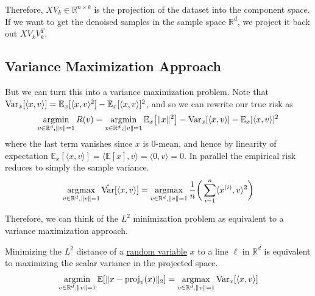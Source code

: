   Therefore, $X V_k \in \mathbb{R}^{n \times k}$ is the projection of the dataset into the component space. If we want to get the denoised samples in the sample space $\mathbb{R}^d$, we project it back out $X V_k V_k^T$. 

\subsection{Variance Maximization Approach}

  But we can turn this into a variance maximization problem. Note that $\operatorname{Var}_x [\langle x, v \rangle] = \mathbb{E}_x [ \langle x, v \rangle^2 ] - \mathbb{E}_x [ \langle x, v \rangle]^2$, and so we can rewrite our true risk as 
  \begin{align}
    \operatorname*{\arg\!\min}_{v \in \mathbb{R}^d, \|v\|=1} R(v) = \operatorname*{\arg\!\min}_{v \in \mathbb{R}^d, \|v\|=1} \mathbb{E}_x \big[ \|x\|^2 \big] - \operatorname{Var}_x [\langle x, v \rangle] - \mathbb{E}_x [ \langle x, v \rangle]^2
  \end{align} 
  where the last term vanishes since $x$ is $0$-mean, and hence by linearity of expectation $\mathbb{E}_x [\langle x, v \rangle] = \langle \mathbb{E}[x], v \rangle = \langle 0, v \rangle = 0$. In parallel the empirical risk reduces to simply the sample variance. 
  \begin{equation}
    \operatorname*{\arg\!\max}_{v \in \mathbb{R}^{d}, \|v\| = 1} \hat{\operatorname{Var}}[ \langle x, v \rangle] = \operatorname*{\arg\!\max}_{v \in \mathbb{R}^{d}, \|v\| = 1} \frac{1}{n} \bigg( \sum_{i=1}^n \langle x^{(i)}, v \rangle^2 \bigg)
  \end{equation} 

  Therefore, we can think of the $L^2$ minimization problem as equivalent to a variance maximization approach.  

  \begin{lemma}
    \label{thm:variance-maximization-approach}
    Minimizing the $L^2$ distance of a \hyperref[prob-def:random-variable]{random variable} $x$ to a line $\ell$ in $\mathbb{R}^d$ is equivalent to maximizing the scalar variance in the projected space. 
    \begin{equation}
      \operatorname*{\arg\!\min}_{v \in \mathbb{R}^d, \|v\| = 1} \mathbb{E} [ \| x - \operatorname{proj}_v (x) \|_2 ] = \operatorname*{\arg\!\max}_{v \in \mathbb{R}^d, \|v\| = 1} \operatorname{Var}_x [\langle x, v \rangle ]
    \end{equation}
  \end{lemma}


